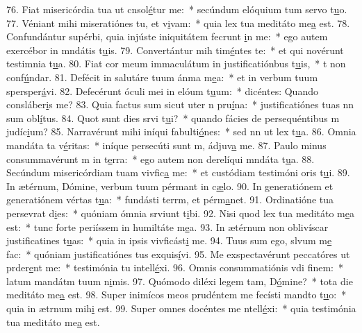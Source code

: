 76. Fiat misericórdia tua ut cnsol\uline{é}tur me:~* secúndum elóquium tum servo t\uline{u}o.
77. Véniant mihi miseratiónes tu, et v\uline{i}vam:~* quia lex tua meditáto me\uline{a} est.
78. Confundántur supérbi, quia injúste iniquitátem fecrunt \uline{i}n me:~* ego autem exercébor in mndátis t\uline{u}is.
79. Convertántur mih tim\uline{é}ntes te:~* et qui novérunt testimnia t\uline{u}a.
80. Fiat cor meum immaculátum in justificatiónbus t\uline{u}is,~* t non conf\uline{ú}ndar.
81. Defécit in salutáre tuum ánma m\uline{e}a:~* et in verbum tuum spersper\uline{á}vi.
82. Defecérunt óculi mei in elóum t\uline{u}um:~* dicéntes: Quando consláber\uline{i}s me?
83. Quia factus sum sicut uter n pru\uline{í}na:~* justificatiónes tuas nn sum obl\uline{í}tus.
84. Quot sunt dies srvi t\uline{u}i?~* quando fácies de persequéntibus m judíc\uline{i}um?
85. Narravérunt mihi iníqui fabulti\uline{ó}nes:~* sed nn ut lex t\uline{u}a.
86. Omnia mandáta ta v\uline{é}ritas:~* iníque persecúti sunt m, ádjuv\uline{a} me.
87. Paulo minus consummavérunt m in t\uline{e}rra:~* ego autem non derelíqui mndáta t\uline{u}a.
88. Secúndum misericórdiam tuam vivfic\uline{a} me:~* et custódiam testimóni oris t\uline{u}i.
89. In ætérnum, Dómine, verbum tuum pérmant in c\uline{æ}lo.
90. In generatiónem et generatiónem vértas t\uline{u}a:~* fundásti terrm, et pérm\uline{a}net.
91. Ordinatióne tua persevrat d\uline{i}es:~* quóniam ómnia srviunt t\uline{i}bi.
92. Nisi quod lex tua meditáto m\uline{e}a est:~* tunc forte periíssem in humiltáte m\uline{e}a.
93. In ætérnum non oblivíscar justificatines t\uline{u}as:~* quia in ipsis vivficást\uline{i} me.
94. Tuus sum ego, slvum m\uline{e} fac:~* quóniam justificatiónes tus exquis\uline{í}vi.
95. Me exspectavérunt peccatóres ut prder\uline{e}nt me:~* testimónia tu intell\uline{é}xi.
96. Omnis consummatiónis vdi f\uline{i}nem:~* latum mandátm tuum n\uline{i}mis.
97. Quómodo diléxi legem tam, D\uline{ó}mine?~* tota die meditáto me\uline{a} est.
98. Super inimícos meos prudéntem me fecísti mandto t\uline{u}o:~* quia in ætrnum mih\uline{i} est.
99. Super omnes docéntes me ntell\uline{é}xi:~* quia testimónia tua meditáto me\uline{a} est.
